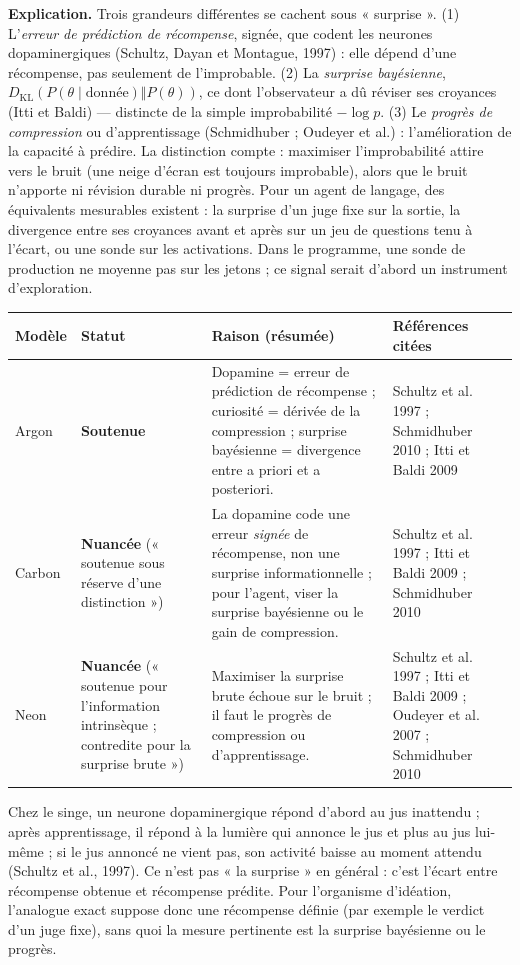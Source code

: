 \documentclass[a4paper,11pt]{article}
\makeatletter
\newenvironment{avis}{\small\renewcommand{\arraystretch}{1.15}%
\begin{longtable}{@{}>{\raggedright\arraybackslash}p{1.35cm}>{\raggedright\arraybackslash}p{2.45cm}>{\raggedright\arraybackslash}p{7.15cm}>{\raggedright\arraybackslash}p{4.4cm}@{}}
\toprule \textbf{Modèle} & \textbf{Statut} & \textbf{Raison (résumée)} & \textbf{Références citées}\\ \midrule \endhead
\bottomrule \endfoot}{\end{longtable}}
\newcommand{\st}[1]{\textbf{#1}}
\makeatother
\begin{document}
\textbf{Explication.} Trois grandeurs différentes se cachent sous « surprise ». (1) L'\emph{erreur de prédiction de récompense}, signée, que codent les neurones dopaminergiques (Schultz, Dayan et Montague, 1997) : elle dépend d'une récompense, pas seulement de l'improbable. (2) La \emph{surprise bayésienne}, $D_{\mathrm{KL}}(P(\theta\mid\text{donnée})\Vert P(\theta))$, ce dont l'observateur a dû réviser ses croyances (Itti et Baldi) — distincte de la simple improbabilité $-\log p$. (3) Le \emph{progrès de compression} ou d'apprentissage (Schmidhuber ; Oudeyer et al.) : l'amélioration de la capacité à prédire. La distinction compte : maximiser l'improbabilité attire vers le bruit (une neige d'écran est toujours improbable), alors que le bruit n'apporte ni révision durable ni progrès. Pour un agent de langage, des équivalents mesurables existent : la surprise d'un juge fixe sur la sortie, la divergence entre ses croyances avant et après sur un jeu de questions tenu à l'écart, ou une sonde sur les activations. Dans le programme, une sonde de production ne moyenne pas sur les jetons ; ce signal serait d'abord un instrument d'exploration.

\begin{avis}
Argon & \st{Soutenue} & Dopamine = erreur de prédiction de récompense ; curiosité = dérivée de la compression ; surprise bayésienne = divergence entre a priori et a posteriori. & Schultz et al. 1997 ; Schmidhuber 2010 ; Itti et Baldi 2009\\ \midrule
Carbon & \st{Nuancée} (« soutenue sous réserve d'une distinction ») & La dopamine code une erreur \emph{signée} de récompense, non une surprise informationnelle ; pour l'agent, viser la surprise bayésienne ou le gain de compression. & Schultz et al. 1997 ; Itti et Baldi 2009 ; Schmidhuber 2010\\ \midrule
Neon & \st{Nuancée} (« soutenue pour l'information intrinsèque ; contredite pour la surprise brute ») & Maximiser la surprise brute échoue sur le bruit ; il faut le progrès de compression ou d'apprentissage. & Schultz et al. 1997 ; Itti et Baldi 2009 ; Oudeyer et al. 2007 ; Schmidhuber 2010\\
\end{avis}

\begin{exemple}
Chez le singe, un neurone dopaminergique répond d'abord au jus inattendu ; après apprentissage, il répond à la lumière qui annonce le jus et plus au jus lui-même ; si le jus annoncé ne vient pas, son activité baisse au moment attendu (Schultz et al., 1997). Ce n'est pas « la surprise » en général : c'est l'écart entre récompense obtenue et récompense prédite. Pour l'organisme d'idéation, l'analogue exact suppose donc une récompense définie (par exemple le verdict d'un juge fixe), sans quoi la mesure pertinente est la surprise bayésienne ou le progrès.
\end{exemple}
\end{document}

